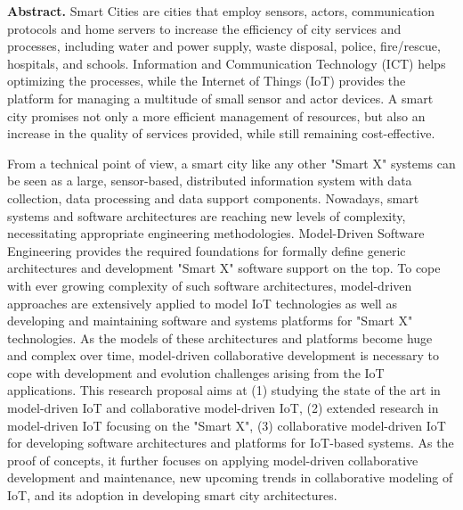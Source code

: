 \textbf{Abstract.} Smart Cities are cities that employ sensors, actors, communication protocols and home servers to increase the efficiency of city services and processes, including water and power supply, waste disposal, police, fire/rescue, hospitals, and schools. Information and Communication Technology (ICT) helps optimizing the processes, while the Internet of Things (IoT) provides the platform for managing a multitude of small sensor and actor devices. A smart city promises not only a more efficient management of resources, but also an increase in the quality of services provided, while still remaining cost-effective. 

From a technical point of view, a smart city like any other "Smart X" systems can be seen as a large, sensor-based, distributed information system with data collection, data processing and data support components. Nowadays, smart systems and software architectures are reaching new levels of complexity, necessitating appropriate engineering methodologies. Model-Driven Software Engi­neer­ing provides the required foundations for formally define generic architectures and development "Smart X" software support on the top. To cope with ever growing complexity of such software architectures, model-driven approaches are extensively applied to model IoT technologies as well as developing and maintaining software and systems platforms for "Smart X" technologies. As the models of these architectures and platforms become huge and complex over time, model-driven collaborative development is necessary to cope with development and evolution challenges arising from the IoT applications. This research proposal aims at (1) studying the state of the art in model-driven IoT and collaborative model-driven IoT, (2) extended research in model-driven IoT focusing on the "Smart X", (3) collaborative model-driven IoT for developing software architectures and platforms for IoT-based systems. As the proof of concepts, it further focuses on applying model-driven collaborative development and maintenance, new upcoming trends in collaborative modeling of IoT, and its adoption in developing smart city architectures.